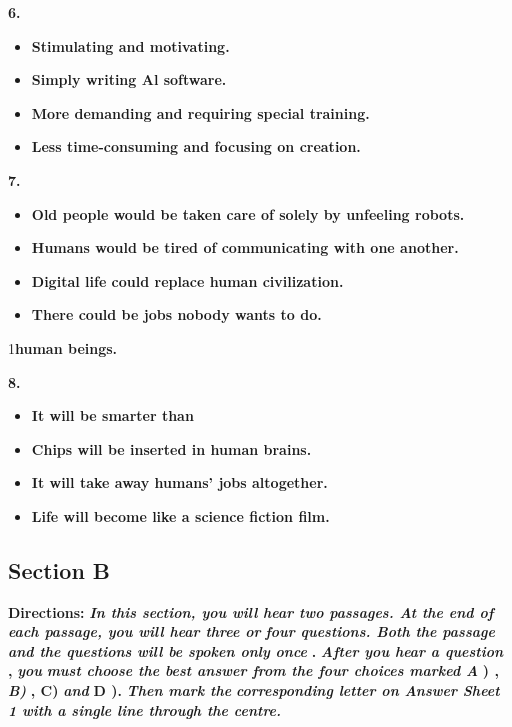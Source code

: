 \documentclass[UTF8,11pt]{ctexart}
\begin{document}
\textbf{6.}


\begin{itemize}[leftmargin=2em,itemsep=.2em,topsep=.4em]\item[A.] \textbf{Stimulating and motivating.}
\item[B.] \textbf{Simply writing Al software.}
\item[C.] \textbf{More demanding and requiring special training.}
\item[D.] \textbf{Less time-consuming and focusing on creation.}
\end{itemize}

\textbf{7.}


\begin{itemize}[leftmargin=2em,itemsep=.2em,topsep=.4em]\item[A.] \textbf{Old people would be taken care of solely by unfeeling robots.}
\item[B.] \textbf{Humans would be tired of communicating with one another.}
\item[C.] \textbf{Digital life could replace human civilization.}
\item[D.] \textbf{There could be jobs nobody wants to do.}
\end{itemize}

1\textbf{human beings.}


\textbf{8.}


\begin{itemize}[leftmargin=2em,itemsep=.2em,topsep=.4em]\item[A.] \textbf{It will be smarter than}
\item[B.] \textbf{Chips will be inserted in human brains.}
\item[C.] \textbf{It will take away humans' jobs altogether.}
\item[D.] \textbf{Life will become like a science fiction film.}
\end{itemize}

\subsection*{\textbf{Section B}}


\textbf{Directions: }\textbf{\textit{In this section, you will hear two passages. At the end of each passage, you will hear three or}} \textbf{\textit{four questions. Both the passage and the questions will be spoken only once }}\textbf{. }\textbf{\textit{After you hear a question }}\textbf{, }\textbf{\textit{you}} \textbf{\textit{must choose the best answer from the four choices marked A }}\textbf{) , }\textbf{\textit{B) }}\textbf{, C) }\textbf{\textit{and }}\textbf{D ). }\textbf{\textit{Then mark the}} \textbf{\textit{corresponding letter on Answer Sheet 1 with a single line through the centre.}}
\end{document}
